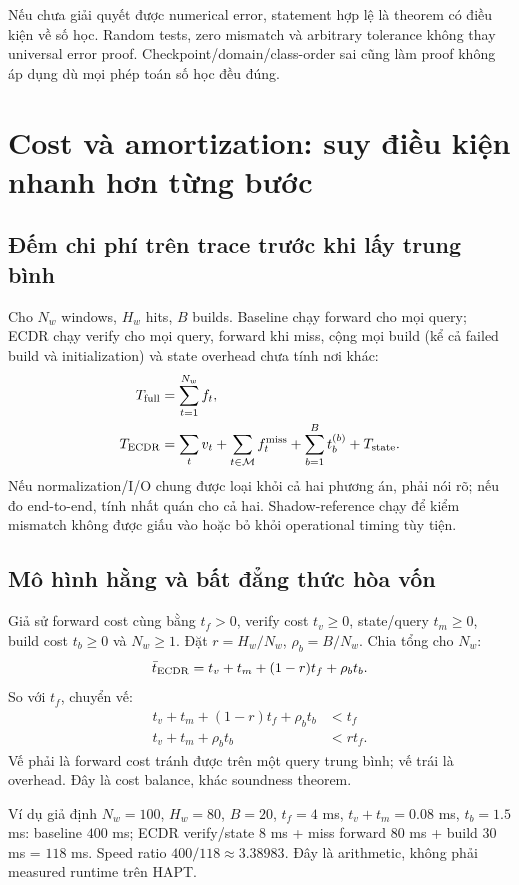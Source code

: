 \documentclass[11pt,a4paper]{article}
\theoremstyle{definition}
\begin{document}
Nếu chưa giải quyết được numerical error, statement hợp lệ là theorem có
điều kiện về số học. Random tests, zero mismatch và arbitrary tolerance
không thay universal error proof. Checkpoint/domain/class-order sai cũng
làm proof không áp dụng dù mọi phép toán số học đều đúng.

\section{Cost và amortization: suy điều kiện nhanh hơn từng bước}
\subsection{Đếm chi phí trên trace trước khi lấy trung bình}
Cho $N_w$ windows, $H_w$ hits, $B$ builds. Baseline chạy forward cho mọi
query; ECDR chạy verify cho mọi query, forward khi miss, cộng mọi build
(kể cả failed build và initialization) và state overhead chưa tính nơi khác:
\begin{align}
T_{\rm full}&=\sum_{t=1}^{N_w}f_t,\\
T_{\rm ECDR}&=\sum_tv_t+\sum_{t\in\mathcal M}f_t^{\rm miss}
+\sum_{b=1}^Bt_b^{(b)}+T_{\rm state}.
\end{align}
Nếu normalization/I/O chung được loại khỏi cả hai phương án, phải nói rõ;
nếu đo end-to-end, tính nhất quán cho cả hai. Shadow-reference chạy để
kiểm mismatch không được giấu vào hoặc bỏ khỏi operational timing tùy tiện.

\subsection{Mô hình hằng và bất đẳng thức hòa vốn}
Giả sử forward cost cùng bằng $t_f>0$, verify cost $t_v\ge0$,
state/query $t_m\ge0$, build cost $t_b\ge0$ và $N_w\ge1$.
Đặt $r=H_w/N_w$, $\rho_b=B/N_w$. Chia tổng cho $N_w$:
\begin{equation}
\bar t_{\rm ECDR}=t_v+t_m+(1-r)t_f+\rho_b t_b.
\end{equation}
So với $t_f$, chuyển vế:
\begin{align}
t_v+t_m+(1-r)t_f+\rho_b t_b&<t_f\\
t_v+t_m+\rho_b t_b&<rt_f.
\end{align}
Vế phải là forward cost tránh được trên một query trung bình; vế trái là
overhead. Đây là cost balance, khác soundness theorem.

Ví dụ giả định $N_w=100$, $H_w=80$, $B=20$, $t_f=4$ ms,
$t_v+t_m=0.08$ ms, $t_b=1.5$ ms: baseline $400$ ms;
ECDR verify/state $8$ ms + miss forward $80$ ms + build $30$ ms =
$118$ ms. Speed ratio $400/118\approx3.38983$. Đây là arithmetic,
không phải measured runtime trên HAPT.
\end{document}
